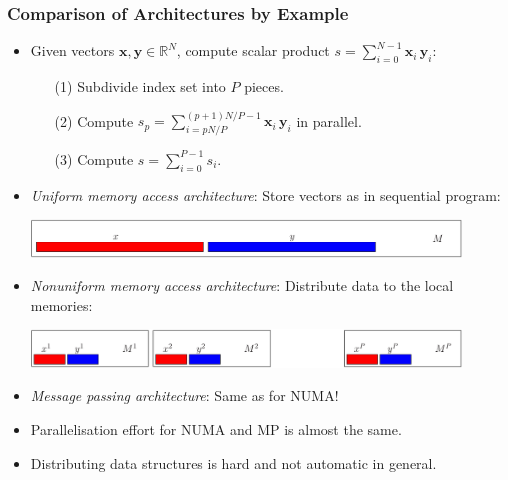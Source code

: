 \documentclass[aspectratio=169,11pt]{beamer}
\theoremstyle{definition}
\begin{document}
\begin{frame}
\frametitle{Comparison of Architectures by Example}
\begin{itemize}
\item Given vectors $\mathbf{x},\mathbf{y}\in\mathbb{R}^N$, compute scalar product $s =
  \sum_{i=0}^{N-1} \mathbf{x}_i \, \mathbf{y}_i$:
\begin{itemize}
\item[(1)] Subdivide index set into $P$ pieces.
\item[(2)] Compute $s_p=\sum_{i=pN/P}^{(p+1)N/P-1} \mathbf{x}_i \, \mathbf{y}_i$ in
  parallel.
\item[(3)] Compute $s = \sum_{i=0}^{P-1} s_i$.
\end{itemize}
\item \textit{Uniform memory access architecture}: Store vectors as in
  sequential program:
\begin{center}
  \includegraphics[width=0.9\textwidth]{umalayout}
\end{center}
\item \textit{Nonuniform memory access architecture}: Distribute
  data to the local memories:
\begin{center}
  \includegraphics[width=0.9\textwidth]{numalayout}
\end{center}
\item \textit{Message passing architecture}: Same as for NUMA!
\item Parallelisation effort for NUMA and MP is almost the same.
\item Distributing data structures is hard and not automatic in
  general.
\end{itemize}
\end{frame}
\end{document}
